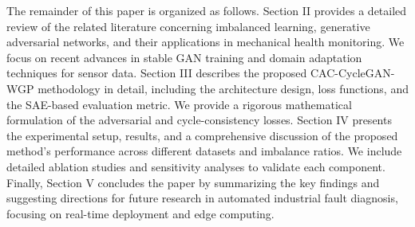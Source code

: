 The remainder of this paper is organized as follows. Section II provides a detailed review of the related literature concerning imbalanced learning, generative adversarial networks, and their applications in mechanical health monitoring. We focus on recent advances in stable GAN training and domain adaptation techniques for sensor data. Section III describes the proposed CAC-CycleGAN-WGP methodology in detail, including the architecture design, loss functions, and the SAE-based evaluation metric. We provide a rigorous mathematical formulation of the adversarial and cycle-consistency losses. Section IV presents the experimental setup, results, and a comprehensive discussion of the proposed method's performance across different datasets and imbalance ratios. We include detailed ablation studies and sensitivity analyses to validate each component. Finally, Section V concludes the paper by summarizing the key findings and suggesting directions for future research in automated industrial fault diagnosis, focusing on real-time deployment and edge computing.
